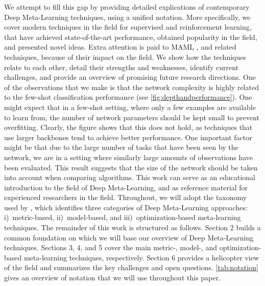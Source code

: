 We attempt to fill this gap by providing detailed explications of contemporary Deep Meta-Learning techniques, using a unified notation. 
More specifically, we cover modern techniques in the field for supervised and reinforcement learning, that have achieved state-of-the-art performance, obtained popularity in the field, and presented novel ideas. 
Extra attention is paid to MAML , and related techniques, because of their impact on the field.
We show how the techniques relate to each other, detail their strengths and weaknesses,  identify current challenges, and provide an overview of promising future research directions.
One of the observations that we make is that the network complexity is highly related to the few-shot classification performance (see \autoref{fig:depthandperformance}).
One might expect that in a few-shot setting, where only a few examples are available to learn from, the number of network parameters should be kept small to prevent overfitting. 
Clearly, the figure shows that this does not hold, as techniques that use larger backbones tend to achieve better performance. 
One important factor might be that due to the large number of tasks that have been seen by the network, we are in a setting where similarly large amounts of observations have been evaluated.
This result suggests that the size of the network should be taken into account when comparing algorithms.
This work can serve as an educational introduction to the field of Deep Meta-Learning, and as reference material for  experienced researchers in the field. Throughout, we will adopt the taxonomy used by , which identifies three categories of Deep Meta-Learning approaches: i)~metric-based, ii)~model-based, and iii)~optimization-based meta-learning techniques.   
The remainder of this work is structured as follows. Section 2 builds a common foundation on which we will base our overview of Deep Meta-Learning techniques. Sections 3, 4, and 5 cover the main metric-, model-, and optimization-based meta-learning techniques, respectively. Section 6 provides a helicopter view of the field and summarizes the key challenges and open questions. \autoref{tab:notation} gives an overview of notation that we will use throughout this paper. 
